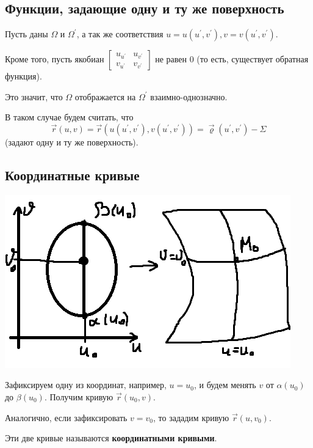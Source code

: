 \documentclass[12pt]{article}
\begin{document}
\subsection{Функции, задающие одну и ту же поверхность}
Пусть даны $\Omega$ и $\Omega^{'}$, а так же соответствия $u=u(u^{'},v^{'}), v=v(u^{'},v^{'})$.\par
Кроме того, пусть якобиан $\begin{bmatrix} u_{u^{'}} & u_{v^{'}} \\ v_{u^{'}} & v_{v^{'}} \end{bmatrix}$ не равен 0 (то есть, существует обратная функция).\par
Это значит, что $\Omega$ отображается на $\Omega^{'}$ взаимно-однозначно.\par
В таком случае будем считать, что
$$\overrightarrow{r}(u,v) = \overrightarrow{r}(u(u^{'},v^{'}),v(u^{'},v^{'}))=\overrightarrow{\varrho}(u^{'},v^{'}) - \Sigma$$
(задают одну и ту же поверхность).
\subsection{Координатные кривые}
\includegraphics{coordCurves}\par
Зафиксируем одну из координат, например, $u=u_0$, и будем менять $v$ от $\alpha(u_0)$ до $\beta(u_0)$. Получим кривую $\overrightarrow{r}(u_0,v)$.\par
Аналогично, если зафиксировать $v=v_0$, то зададим кривую $\overrightarrow{r}(u,v_0)$.\par
Эти две кривые называются \textbf{координатными кривыми}.\par
\end{document}
